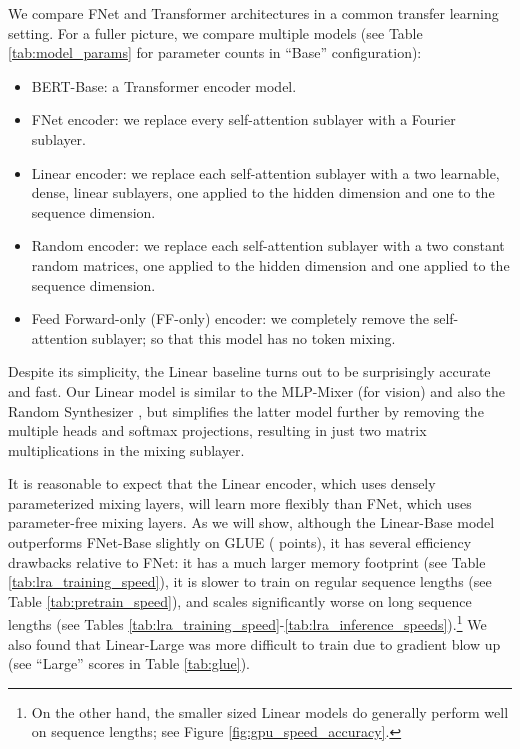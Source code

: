 \documentclass[11pt]{article}
\begin{document}
We compare FNet and Transformer architectures in a common transfer learning setting. For a fuller picture, we compare multiple models (see Table \ref{tab:model_params} for parameter counts in ``Base'' configuration): 
\begin{itemize}
    \item BERT-Base: a Transformer encoder model.
    \item FNet encoder: we replace every self-attention sublayer with a Fourier sublayer.
    \item Linear encoder: we replace each self-attention sublayer with a two learnable, dense, linear sublayers, one applied to the hidden dimension and one to the sequence dimension.
    \item Random encoder: we replace each self-attention sublayer with a two constant random matrices, one applied to the hidden dimension and one applied to the sequence dimension.
    \item Feed Forward-only (FF-only) encoder: we completely remove the self-attention sublayer; so that this model has no token mixing.
\end{itemize}


Despite its simplicity, the Linear baseline turns out to be surprisingly accurate and fast. Our Linear model is similar to the MLP-Mixer \citep{tolstikhin2021mlp} (for vision) and also the Random Synthesizer \citep{tay2020synthesizer}, but simplifies the latter model further by removing the multiple heads and softmax projections, resulting in just two matrix multiplications in the mixing sublayer. 


It is reasonable to expect that the Linear encoder, which uses densely parameterized mixing layers, will learn more flexibly than FNet, which uses parameter-free mixing layers. As we will show, although the Linear-Base model outperforms FNet-Base slightly on GLUE ( points), it has several efficiency drawbacks relative to FNet: it has a much larger memory footprint (see Table \ref{tab:lra_training_speed}), it is slower to train on regular  sequence lengths (see Table \ref{tab:pretrain_speed}), and scales significantly worse on long sequence lengths (see Tables \ref{tab:lra_training_speed}-\ref{tab:lra_inference_speeds}).\footnote{On the other hand, the smaller sized Linear models do generally perform well on  sequence lengths; see Figure \ref{fig:gpu_speed_accuracy}.} We also found that Linear-Large was more difficult to train due to gradient blow up (see ``Large'' scores in Table \ref{tab:glue}).
\end{document}
